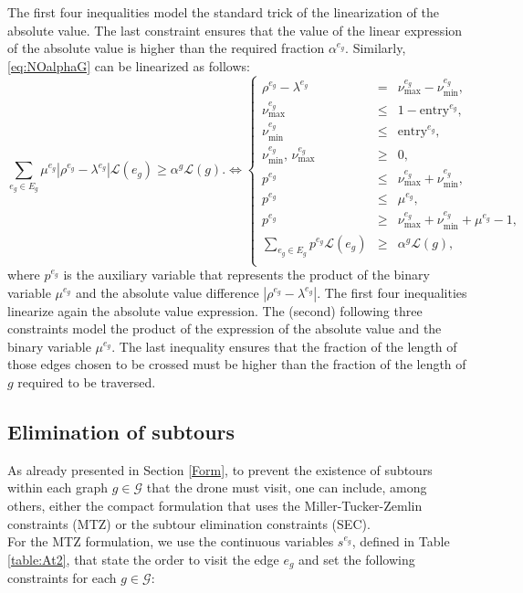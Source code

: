 \noindent
The first four inequalities model the standard trick of the linearization of the absolute value. The last constraint ensures that the value of the linear expression of the absolute value is higher than the required fraction $\alpha^{e_g}$.
\noindent
Similarly, \eqref{eq:NOalphaG} can be linearized as follows:
\begin{equation}\label{eq:NOalpha-G}\tag{$\alpha$-G}
 \sum_{e_g\in E_g} \mu^{e_g}|\rho^{e_g}-\lambda^{e_g}|\mathcal L(e_g)\geq \alpha^g\mathcal L(g). \Longleftrightarrow
 \left\{
 \begin{array}{ccl}
  \rho^{e_g} - \lambda^{e_g}                       & =    & \nu_\text{max}^{e_g} - \nu_\text{min}^{e_g},                                     \\
  \nu_\text{max}^{e_g}                         & \leq & 1-{\text{entry}^{e_g}},                                   \\
  \nu_\text{min}^{e_g}                      & \leq & {  \text{entry}^{e_g}},                                        \\
  \nu_\text{min}^{e_g}, \,\nu_\text{max}^{e_g} & \geq & 0, \\
  p^{e_g} & \leq & \nu_\text{max}^{e_g} + \nu_\text{min}^{e_g}, \\
  p^{e_g} & \leq & \mu^{e_g}, \\
  p^{e_g} & \geq & \nu_\text{max}^{e_g} + \nu_\text{min}^{e_g} + \mu^{e_g} - 1, \\
  \sum_{e_g\in E_g} p^{e_g}\mathcal L(e_g) & \geq & \alpha^{g}\mathcal L(g),
  \\
 \end{array}
 \right.
\end{equation}
where $p^{e_g}$ is the auxiliary variable that represents the product of the binary variable $\mu^{e_g}$ and the absolute value difference $|\rho^{e_g} - \lambda^{e_g}|$. The first four inequalities linearize again the absolute value expression. The (second) following three constraints model the product of the expression of the absolute value and the binary variable $\mu^{e_g}$. The last inequality ensures that the fraction of the length of those edges chosen to be crossed must be higher than the fraction of the length of $g$ required to be traversed.

\subsection*{Elimination of subtours}
\noindent
As already presented in Section \ref{Form},  to prevent the existence of subtours within each graph $g\in \mathcal G$ that the drone must visit, one can include, among others, either the compact formulation that uses the Miller-Tucker-Zemlin constraints (MTZ) or the subtour elimination constraints (SEC).\\
\noindent
For the MTZ formulation, we use the continuous variables $s^{e_g}$, defined in Table \ref{table:At2}, that state the order to visit the edge $e_g$ and set the following constraints for each $g\in\mathcal G$:

